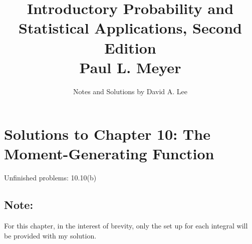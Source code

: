 \documentclass[10pt, oneside]{article}
\title{Introductory Probability and Statistical Applications, Second Edition \\
\large{Paul L. Meyer}}
\author{Notes and Solutions by David A. Lee}
\date{}							%
\begin{document}
\maketitle
\section*{Solutions to Chapter 10: The Moment-Generating Function}

Unfinished problems: 10.10(b)

\subsection*{Note:}

For this chapter, in the interest of brevity, only the set up for each integral will be provided with my solution.
\end{document}
